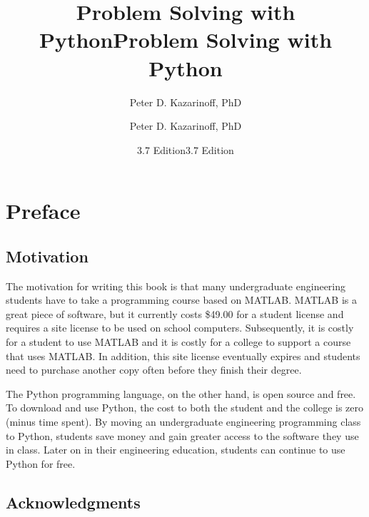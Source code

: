 \documentclass{book}
\title{Problem Solving with Python}
\author{Peter D. Kazarinoff, PhD}
\date{3.7 Edition}
\title{Problem Solving with Python}
\author{Peter D. Kazarinoff, PhD}
\date{3.7 Edition}
\begin{document}
    
    
    
        \maketitle
        
        \newpage
        
        \newpage
        {
        \hypersetup{linkcolor=black}    %
        \tableofcontents
        }
    
    


    

    
        \hypertarget{preface}{%
\chapter{Preface}\label{preface}}
    




    
        \hypertarget{motivation}{%
\section{Motivation}\label{motivation}}
    




    
        The motivation for writing this book is that many undergraduate
engineering students have to take a programming course based on MATLAB.
MATLAB is a great piece of software, but it currently costs \$49.00 for
a student license and requires a site license to be used on school
computers. Subsequently, it is costly for a student to use MATLAB and it
is costly for a college to support a course that uses MATLAB. In
addition, this site license eventually expires and students need to
purchase another copy often before they finish their degree.

The Python programming language, on the other hand, is open source and
free. To download and use Python, the cost to both the student and the
college is zero (minus time spent). By moving an undergraduate
engineering programming class to Python, students save money and gain
greater access to the software they use in class. Later on in their
engineering education, students can continue to use Python for free.
    




    
        \hypertarget{acknowledgments}{%
\section{Acknowledgments}\label{acknowledgments}}
    
\end{document}
